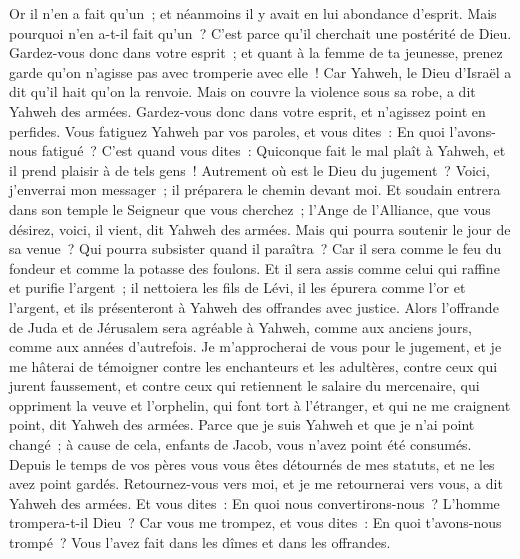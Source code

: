 \begin{multicols}{2}
Or il n'en a fait qu'un~; et néanmoins il y avait en lui abondance d'esprit. Mais pourquoi n'en a-t-il fait qu'un~? C'est parce qu'il cherchait une postérité de Dieu. Gardez-vous donc dans votre esprit~; et quant à la femme de ta jeunesse, prenez garde qu'on n'agisse pas avec tromperie avec elle~!
Car Yahweh, le Dieu d'Israël a dit qu'il hait qu'on la renvoie. Mais on couvre la violence sous sa robe, a dit Yahweh des armées. Gardez-vous donc dans votre esprit, et n'agissez point en perfides.
Vous fatiguez Yahweh par vos paroles, et vous dites~: En quoi l'avons-nous fatigué~? C'est quand vous dites~: Quiconque fait le mal plaît à Yahweh, et il prend plaisir à de tels gens~! Autrement où est le Dieu du jugement~?
\VerseOne{}Voici, j'enverrai mon messager~; il préparera le chemin devant moi. Et soudain entrera dans son temple le Seigneur que vous cherchez~; l'Ange de l'Alliance, que vous désirez, voici, il vient, dit Yahweh des armées.
Mais qui pourra soutenir le jour de sa venue~? Qui pourra subsister quand il paraîtra~? Car il sera comme le feu du fondeur et comme la potasse des foulons.
Et il sera assis comme celui qui raffine et purifie l'argent~; il nettoiera les fils de Lévi, il les épurera comme l'or et l'argent, et ils présenteront à Yahweh des offrandes avec justice.
Alors l'offrande de Juda et de Jérusalem sera agréable à Yahweh, comme aux anciens jours, comme aux années d'autrefois.
Je m'approcherai de vous pour le jugement, et je me hâterai de témoigner contre les enchanteurs et les adultères, contre ceux qui jurent faussement, et contre ceux qui retiennent le salaire du mercenaire, qui oppriment la veuve et l'orphelin, qui font tort à l'étranger, et qui ne me craignent point, dit Yahweh des armées.
Parce que je suis Yahweh et que je n'ai point changé~; à cause de cela, enfants de Jacob, vous n'avez point été consumés.
Depuis le temps de vos pères vous vous êtes détournés de mes statuts, et ne les avez point gardés. Retournez-vous vers moi, et je me retournerai vers vous, a dit Yahweh des armées. Et vous dites~: En quoi nous convertirons-nous~?
L'homme trompera-t-il Dieu~? Car vous me trompez, et vous dites~: En quoi t'avons-nous trompé~? Vous l'avez fait dans les dîmes et dans les offrandes.

\end{multicols}
